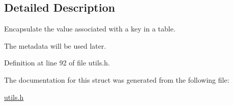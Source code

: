 \subsection{Detailed Description}
Encapsulate the value associated with a key in a table. 

The metadata will be used later. 

Definition at line 92 of file utils.\-h.



The documentation for this struct was generated from the following file\-:\begin{DoxyCompactItemize}
\item 
\hyperlink{utils_8h}{utils.\-h}\end{DoxyCompactItemize}
